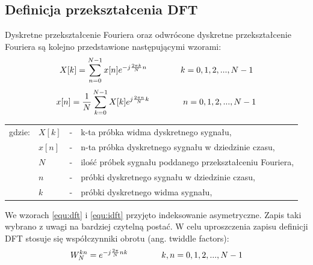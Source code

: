\subsection{Definicja przekształcenia DFT}
Dyskretne przekształcenie Fouriera oraz odwrócone dyskretne przekształcenie Fouriera są kolejno przedstawione następującymi wzorami:
\begin{equation} \label{equ:dft}
\openup\jot
\begin{aligned}[t]
X[k] = \sum_{n=0}^{N-1} x[n]e^{-j\frac{2\pi k}{N}n} \\ 
\end{aligned}
\qquad\qquad %
\begin{aligned}[t]
k = 0, 1, 2, ..., N - 1 \\
\end{aligned}
\end{equation}
\begin{equation} \label{equ:idft}
\openup\jot
\begin{aligned}[t]
x[n] = \frac{1}{N}\sum_{k=0}^{N-1} X[k]e^{j\frac{2\pi n}{N}k}  \\  
\end{aligned}
\qquad\qquad %
\begin{aligned}[t]
 n = 0, 1, 2, ..., N - 1 \\
 \end{aligned}
\end{equation}
\begin{tabular}{ l l l l}
	gdzie: & $X[k]$ &  - & k-ta próbka widma dyskretnego sygnału, \\
	&	$x[n]$ & - &  n-ta próbka dyskretnego sygnału w dziedzinie czasu, \\
	&	$N$ & - &  ilość próbek sygnału poddanego przekształceniu Fouriera,\\
	&	$n$ & - &  próbki dyskretnego sygnału w dziedzinie czasu, \\
	&	$k$ & - &  próbki dyskretnego widma sygnału, \\
\end{tabular}

We wzorach \ref{equ:dft} i \ref{equ:idft} przyjęto indeksowanie asymetryczne. Zapis taki wybrano z uwagi na bardziej czytelną postać. W celu uproszczenia zapisu definicji DFT stosuje się współczynniki obrotu (ang. twiddle factors):
\begin{equation} \label{equ:twid_fact}
\openup\jot
\begin{aligned}[t]
	W_{N}^{kn} = e^{-j\frac{2\pi}{N}nk}  \\
\end{aligned}
\qquad\qquad %
\begin{aligned}[t]
   k, n = 0, 1, 2, ..., N - 1 \\
\end{aligned}
\end{equation}

